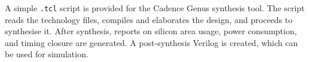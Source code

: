 A simple {\tt .tcl} script is provided for the Cadence Genus synthesis tool. The
script reads the technology files, compiles and elaborates the design, and
proceeds to synthesise it. After synthesis, reports on silicon area usage, power
consumption, and timing closure are generated. A post-synthesis Verilog is
created, which can be used for simulation.
